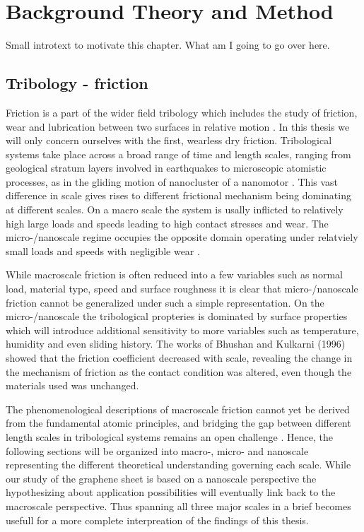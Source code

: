 \newpage
\chapter{Background Theory and Method}

Small introtext to motivate this chapter. What am I going to go over here.


\section{Tribology - friction}


Friction is a part of the wider field tribology which includes the study of
friction, wear and lubrication between two surfaces in relative motion \cite[p.
1]{gnecco_meyer_2015}. In this thesis we will only concern ourselves with the
first, wearless dry friction. Tribological systems take place across a broad
range of time and length scales, ranging from geological stratum layers involved
in earthquakes \cite{kim_nano-scale_2009} to microscopic atomistic processes, as
in the gliding motion of nanocluster of a nanomotor \cite{Manini_2016}. This
vast difference in scale gives rises to different frictional mechanism being
dominating at different scales. On a macro scale the system is usally inflicted
to relatively high large loads and speeds leading to high contact stresses and
wear. The micro-/nanoscale regime occupies the opposite domain operating under
relatviely small loads and speeds with negligible wear
\cite{kim_nano-scale_2009} \cite[p. 5]{bhushan_2013}. 

While macroscale friction is often reduced into a few variables such as normal load, material type, speed
and surface roughness it is clear that micro-/nanoscale friction cannot be
generalized under such a simple representation. On the micro-/nanoscale the tribological propteries is dominated by surface properties which will introduce additional sensitivity to more variables such as temperature, humidity and even sliding history. The works of Bhushan and Kulkarni (1996)\cite{BHUSHAN199649} showed that the friction coefficient decreased with scale, revealing the change in the mechanism of friction as the contact condition was altered, even though the materials used was unchanged.

The phenomenological descriptions of macroscale friction cannot yet be derived from the fundamental atomic principles, and bridging the gap between different length scales in tribological systems remains an open challenge \cite{Manini_2016}. Hence, the following sections will be organized into macro-, micro- and nanoscale representing the different theoretical understanding governing each scale. While our study of the graphene sheet is based on a nanoscale perspective the hypothesizing about application possibilities will eventually link back to the macroscale perspective. Thus spanning all three major scales in a brief becomes usefull for a more complete interpreation of the findings of this thesis. 


